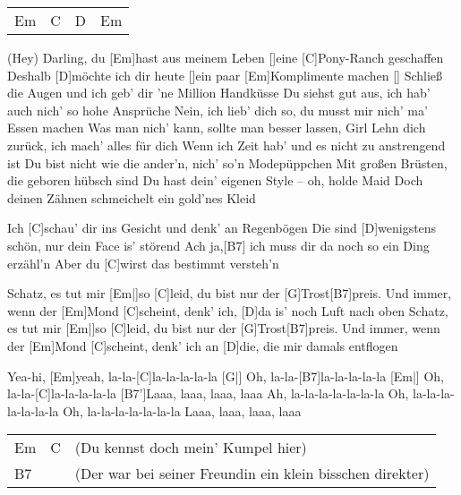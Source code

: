 



\begin{guitar}
	{\footnotesize\begin{tabular}{|l|l|l|l|}
			Em \optionalChord{B} & C & D \optionalChord{G} & Em \optionalChord{D}
	\end{tabular} \optionalChord{(x4)}}

	(Hey) Darling, du [Em]hast aus meinem Leben []eine [C]Pony-Ranch geschaffen
	Deshalb [D]möchte ich dir heute []ein paar [Em]Komplimente machen []{}
	Schließ die Augen und ich geb' dir 'ne Million Handküsse
	Du siehst gut aus, ich hab' auch nich' so hohe Ansprüche
	Nein, ich lieb' dich so, du musst mir nich' ma' Essen machen
	Was man nich' kann, sollte man besser lassen, Girl
	Lehn dich zurück, ich mach' alles für dich
	Wenn ich Zeit hab' und es nicht zu anstrengend ist
	Du bist nicht wie die ander'n, nich' so'n Modepüppchen
	Mit großen Brüsten, die geboren hübsch sind
	Du hast dein' eigenen Style – oh, holde Maid
	Doch deinen Zähnen schmeichelt ein gold'nes Kleid
	
	Ich [C]schau' dir ins Gesicht und denk' an Regenbögen
	Die sind [D]wenigstens schön, nur dein Face is' störend
	Ach ja,[B7] ich muss dir da noch so ein Ding erzähl'n
	Aber du [C]wirst das bestimmt versteh'n
	
	\begin{highlightbar}
		Schatz, es tut mir [Em|]{so }[C]leid, du bist nur der [G]Trost[B7]preis.
		Und immer, wenn der [Em]Mond [C]scheint, denk' ich, [D]da is' noch Luft nach oben
		Schatz, es tut mir [Em|]{so }[C]leid, du bist nur der [G]Trost[B7]preis.
		Und immer, wenn der [Em]Mond [C]scheint, denk' ich an [D]die, die mir damals entflogen
	\end{highlightbar}
	
	\pagebreak
	Yea-hi, [Em]yeah, la-la-[C]la-la-la-la-la
	[G|] Oh, la-la-[B7]la-la-la-la-la
	[Em|] Oh, la-la-[C]la-la-la-la-la
	[B7']Laaa, laaa, laaa, laaa
	Ah, la-la-la-la-la-la-la
	Oh, la-la-la-la-la-la-la
	Oh, la-la-la-la-la-la-la
	Laaa, laaa, laaa, laaa
	
	{\footnotesize\begin{tabular}{|l|l|l}
		Em & C & {\small(Du kennst doch mein' Kumpel hier)} \\
		B7 & & {\small(Der war bei seiner Freundin ein klein bisschen direkter)}
	\end{tabular}}
		

\end{guitar}
